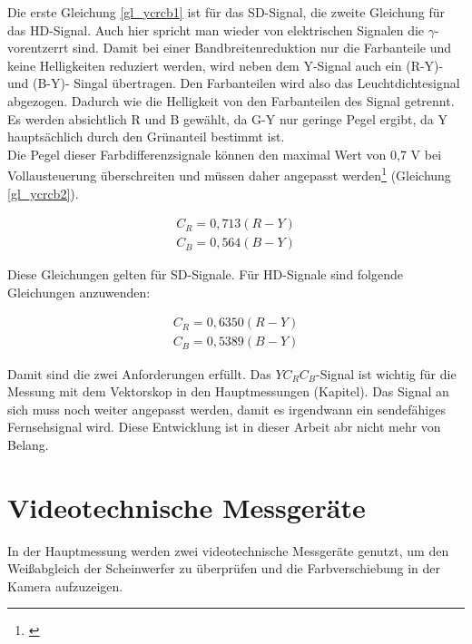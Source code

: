 Die erste Gleichung \ref{gl_ycrcb1} ist für das SD-Signal, die zweite Gleichung für das HD-Signal. Auch hier spricht man wieder von elektrischen Signalen die $\gamma$-vorentzerrt sind. Damit bei einer Bandbreitenreduktion nur die Farbanteile und keine Helligkeiten reduziert werden, wird neben dem Y-Signal auch ein (R-Y)- und (B-Y)- Singal übertragen. Den Farbanteilen wird also das Leuchtdichtesignal abgezogen. Dadurch wie die Helligkeit von den Farbanteilen des Signal getrennt. Es werden absichtlich R und B gewählt, da G-Y nur geringe Pegel ergibt, da Y hauptsächlich durch den Grünanteil bestimmt ist.\\ Die Pegel dieser Farbdifferenzsignale können den maximal Wert von 0,7 V bei Vollausteuerung überschreiten und müssen daher angepasst werden\footnote{\cite[84]{schmidt}} (Gleichung \ref{gl_ycrcb2}).

\begin{eqnarray}\label{gl_ycrcb2}
	C_{R}=0,713(R-Y)\\
	C_{B}=0,564(B-Y)
\end{eqnarray}

Diese Gleichungen gelten für SD-Signale. Für HD-Signale sind folgende Gleichungen anzuwenden:

\begin{eqnarray}\label{gl_ycrcb3}
	C_{R}=0,6350(R-Y)\\
	C_{B}=0,5389(B-Y)
\end{eqnarray}


Damit sind die zwei Anforderungen erfüllt. Das $YC_{R}C_{B}$-Signal ist wichtig für die Messung mit dem Vektorskop in den Hauptmessungen (Kapitel). Das Signal an sich muss noch weiter angepasst werden, damit es irgendwann ein sendefähiges Fernsehsignal wird. Diese Entwicklung ist in dieser Arbeit abr nicht mehr von Belang.



\chapter{Videotechnische Messgeräte}
In der Hauptmessung werden zwei videotechnische Messgeräte genutzt, um den Weißabgleich der Scheinwerfer zu überprüfen und die Farbverschiebung in der Kamera aufzuzeigen.

